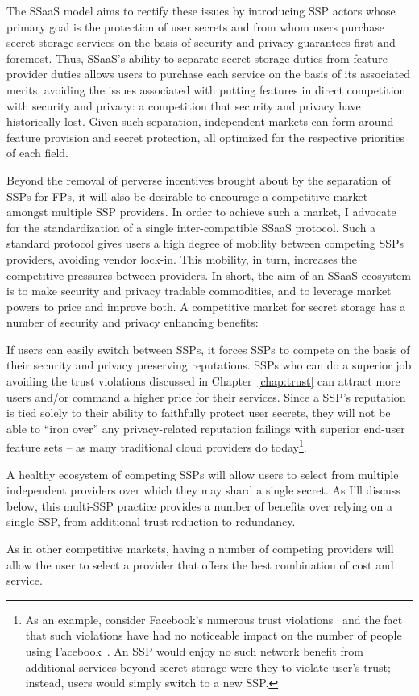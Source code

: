 The SSaaS model aims to rectify these issues by introducing SSP actors
whose primary goal is the protection of user secrets and from whom
users purchase secret storage services on the basis of security and
privacy guarantees first and foremost. Thus, SSaaS's ability to
separate secret storage duties from feature provider duties allows
users to purchase each service on the basis of its associated merits,
avoiding the issues associated with putting features in direct
competition with security and privacy: a competition that security and
privacy have historically lost. Given such separation, independent
markets can form around feature provision and secret protection, all
optimized for the respective priorities of each field.

Beyond the removal of perverse incentives brought about by the
separation of SSPs for FPs, it will also be desirable to encourage a
competitive market amongst multiple SSP providers. In order to achieve
such a market, I advocate for the standardization of a single
inter-compatible SSaaS protocol. Such a standard protocol gives users
a high degree of mobility between competing SSPs providers, avoiding
vendor lock-in. This mobility, in turn, increases the competitive
pressures between providers. In short, the aim of an SSaaS ecosystem
is to make security and privacy tradable commodities, and to leverage
market powers to price and improve both. A competitive market for
secret storage has a number of security and privacy enhancing
benefits:

\begin{packed_desc}
\item[Reputation:] If users can easily switch between SSPs, it forces
  SSPs to compete on the basis of their security and privacy
  preserving reputations. SSPs who can do a superior job avoiding the
  trust violations discussed in Chapter~\ref{chap:trust} can attract
  more users and/or command a higher price for their services. Since a
  SSP's reputation is tied solely to their ability to faithfully
  protect user secrets, they will not be able to ``iron over'' any
  privacy-related reputation failings with superior end-user feature
  sets -- as many traditional cloud providers do today\footnote{As an
    example, consider Facebook's numerous trust
    violations~\cite{goel2014, lomas2014, tsukayama2014} and the fact
    that such violations have had no noticeable impact on the number
    of people using Facebook~\cite{foster2014}. An SSP would enjoy no
    such network benefit from additional services beyond secret
    storage were they to violate user's trust; instead, users would
    simply switch to a new SSP.}.
\item[Multiple Providers:] A healthy ecosystem of competing SSPs will
  allow users to select from multiple independent providers over which
  they may shard a single secret. As I'll discuss below, this
  multi-SSP practice provides a number of benefits over relying on a
  single SSP, from additional trust reduction to redundancy.
\item[Cost:] As in other competitive markets, having a number of
  competing providers will allow the user to select a provider that
  offers the best combination of cost and service.
\end{packed_desc}

